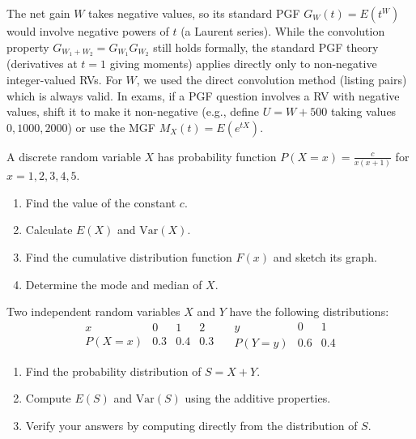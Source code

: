 \documentclass[11pt]{article}
\newcounter{popsec}
\newcounter{popsub}
\newcommand{\courssub}[1]{%
  \stepcounter{popsub}%
  \par\vspace{9pt}\noindent{\popxbold\fontsize{11.5}{13}\selectfont\color{popink}{\color{poporange}\thepopsec.\thepopsub}\hspace{6pt}#1}\par\nopagebreak\vspace{4pt}
}
\begin{document}
\begin{savaistu}
The net gain $W$ takes negative values, so its standard PGF $G_W(t)=E(t^W)$ would involve negative powers of $t$ (a Laurent series). While the convolution property $G_{W_1+W_2}=G_{W_1}G_{W_2}$ still holds formally, the standard PGF theory (derivatives at $t=1$ giving moments) applies directly only to non-negative integer-valued RVs. For $W$, we used the direct convolution method (listing pairs) which is always valid. In exams, if a PGF question involves a RV with negative values, shift it to make it non-negative (e.g., define $U=W+500$ taking values $0,1000,2000$) or use the MGF $M_X(t)=E(e^{tX})$.
\end{savaistu}

\courssub{Exercises}

\begin{exercice}[Exercise 1]
A discrete random variable $X$ has probability function $P(X=x)=\frac{c}{x(x+1)}$ for $x=1,2,3,4,5$.
\begin{enumerate}
\item Find the value of the constant $c$.
\item Calculate $E(X)$ and $\text{Var}(X)$.
\item Find the cumulative distribution function $F(x)$ and sketch its graph.
\item Determine the mode and median of $X$.
\end{enumerate}
\end{exercice}

\begin{exercice}[Exercise 2]
Two independent random variables $X$ and $Y$ have the following distributions:
\[
\begin{array}{c|ccc}
x & 0 & 1 & 2 \\ \hline
P(X=x) & 0.3 & 0.4 & 0.3
\end{array}
\quad
\begin{array}{c|cc}
y & 0 & 1 \\ \hline
P(Y=y) & 0.6 & 0.4
\end{array}
\]
\begin{enumerate}
\item Find the probability distribution of $S=X+Y$.
\item Compute $E(S)$ and $\text{Var}(S)$ using the additive properties.
\item Verify your answers by computing directly from the distribution of $S$.
\end{enumerate}
\end{exercice}
\end{document}
